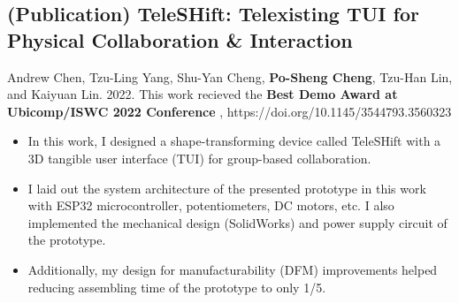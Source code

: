 \documentclass[12pt]{article}
\begin{document}
    \subsection*{(Publication) TeleSHift: Telexisting TUI for Physical Collaboration \& Interaction}
    { \small
    {\scriptsize Andrew Chen, Tzu-Ling Yang, Shu-Yan Cheng, \textbf{Po-Sheng Cheng}, Tzu-Han Lin, and Kaiyuan Lin. 2022. This work recieved the \textbf{Best Demo Award at Ubicomp/ISWC 2022 Conference}%
    , https://doi.org/10.1145/3544793.3560323}
        \begin{itemize}
            \item In this work, I designed a shape-transforming device called TeleSHift with a 3D tangible user interface (TUI) for group-based collaboration.
            \item I laid out the system architecture of the presented prototype in this work with ESP32 microcontroller, potentiometers, DC motors, etc. I also implemented the mechanical design (SolidWorks) and power supply circuit of the prototype.
            \item Additionally, my design for manufacturability (DFM) improvements helped reducing assembling time of the prototype to only 1/5.
        \end{itemize}
        }
    
\end{document}
